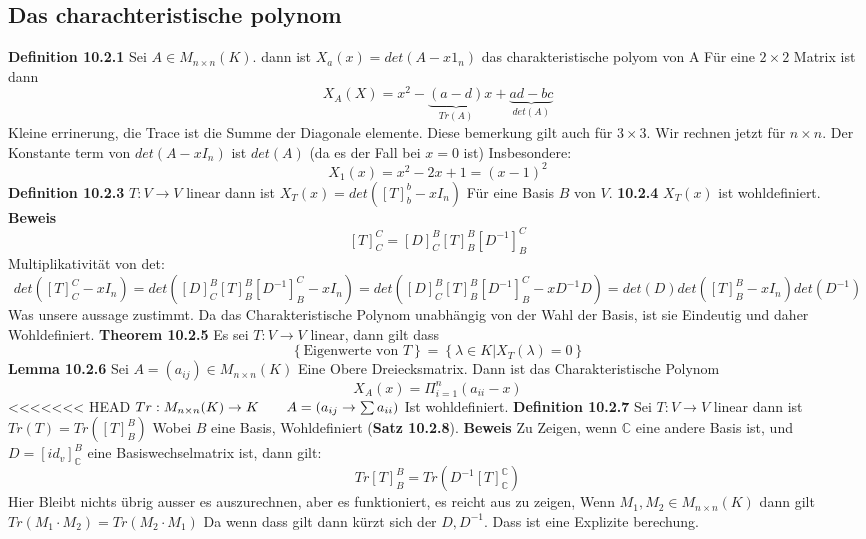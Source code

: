 \documentclass{article}
\newcommand{\mspc}{\hspace{0.7cm}}
\begin{document}
\subsection{Das charachteristische polynom} \textbf{Definition 10.2.1} Sei $A\in M_{n\times n}(K)$. dann ist $X_a(x)=det(A-x1_n)$ das charakteristische polyom von A
Für eine $2\times 2$ Matrix ist dann \[X_A(X)=x^2-\underset{Tr(A)}{\underbrace{(a-d)}}x+\underset{det(A)}{\underbrace{ad-bc}}\]
Kleine errinerung, die Trace ist die Summe der Diagonale elemente. Diese bemerkung gilt auch für $3\times3$. Wir rechnen jetzt für $n\times n$. Der Konstante term von $det(A-xI_n)$ ist $det(A)$ (da es der Fall bei $x=0$ ist)
\newline
Insbesondere:
\[X_1(x)=x^2-2x+1=(x-1)^2\]
\textbf{Definition 10.2.3} $T:V\rightarrow V$ linear dann ist $X_T(x)=det([T]_b^b-xI_n)$ Für eine Basis $B$ von $V$.\newline
\textbf{10.2.4} $X_T(x)$ ist wohldefiniert.\newline
\textbf{Beweis}
\[[T]^C_C=[D]^B_C[T]^B_B[D^{-1}]^C_B\] 
Multiplikativität von det:
\[det([T]^C_C-xI_n)=det([D]^B_C[T]^B_B[D^{-1}]^C_B-xI_n)=det([D]^B_C[T]^B_B[D^{-1}]^C_B-xD^{-1}D)=det(D)det([T]^B_B-xI_n)det(D^{-1})\]
Was unsere  aussage zustimmt.
\newline Da  das  Charakteristische  Polynom unabhängig von der Wahl der Basis, ist sie Eindeutig und daher Wohldefiniert.
\newline\textbf{Theorem 10.2.5} Es sei $T:V\rightarrow V$ linear, dann gilt dass\[\left\lbrace\text{Eigenwerte von }T\right\rbrace=\left\lbrace\lambda\in K|X_T(\lambda)=0\right\rbrace\]
\textbf{Lemma 10.2.6} Sei $A=(a_{ij})\in M_{n\times n}(K)$ Eine Obere Dreiecksmatrix. Dann ist das Charakteristische Polynom \[X_A(x)=\Pi_{i=1}^n(a_{ii}-x)\]
<<<<<<< HEAD
\newline
$Tr:M_{n\times n}(K)\rightarrow K\mspc A=(a_{ij}\rightarrow \sum a_{ii})$ Ist wohldefiniert.
\newline\textbf{Definition 10.2.7} Sei $T:V\rightarrow V$ linear  dann ist $Tr(T)=Tr([T]^B_B)$ Wobei $B$ eine Basis, Wohldefiniert (\textbf{Satz 10.2.8}).
\newline\textbf{Beweis} Zu Zeigen, wenn $\mathbb{C}$ eine andere Basis ist, und  $D=[id_v]_\mathbb{C}^B$ eine Basiswechselmatrix ist, dann gilt: \[Tr[T]^B_B=Tr(D^{-1}[T]^\mathbb{C}_\mathbb{C})\] Hier Bleibt nichts übrig ausser es auszurechnen, aber es funktioniert, es
reicht aus  zu zeigen, Wenn $M_1,M_2\in M_{n\times n}(K)$ dann gilt $Tr(M_1\cdot M_2)=Tr(M_2\cdot M_1)$ Da wenn dass gilt dann kürzt sich der $D, D^{-1}$. Dass ist eine Explizite berechung.
\end{document}
